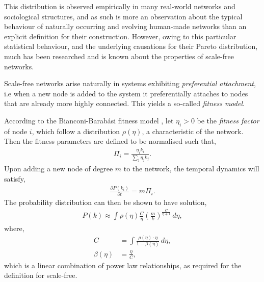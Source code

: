 This distribution is observed empirically in many real-world networks and sociological structures, and as such is more an observation about the typical behaviour of naturally occurring and evolving human-made networks than an explicit definition for their construction. However, owing to this particular statistical behaviour, and the underlying causations for their Pareto distribution, much has been researched and is known about the properties of scale-free networks.

Scale-free networks arise naturally in systems exhibiting \textit{preferential attachment}, i.e when a new node is added to the system it preferentially attaches to nodes that are already more highly connected. This yields a so-called \textit{fitness model}.

According to the Bianconi-Barab{\'a}si fitness model \cite{bib:BBfitness, bib:BAfitness}, let \mbox{$\eta_i>0$} be the \textit{fitness factor} of node $i$, which follow a distribution $\rho(\eta)$, a characteristic of the network. Then the fitness parameters are defined to be normalised such that,
\begin{align}
\Pi_i = \frac{\eta_i k_i}{\sum_j \eta_j k_j}.	
\end{align}
Upon adding a new node of degree $m$ to the network, the temporal dynamics will satisfy,
\begin{align}
\frac{\partial P(k_i)}{\partial t}= m\Pi_i.	
\end{align}
The probability distribution can then be shown to have solution,
\begin{align}
P(k) \approx \int \rho(\eta)\frac{C}{\eta}\left(\frac{m}{k}\right)^\frac{C}{\eta+1}\,d\eta,
\end{align}
where,
\begin{align}
	C &= \int \frac{\rho(\eta)\cdot\eta}{1-\beta(\eta)}\,d\eta,\nonumber\\
	\beta(\eta) &= \frac{\eta}{C},
\end{align}
which is a linear combination of power law relationships, as required for the definition for scale-free.

